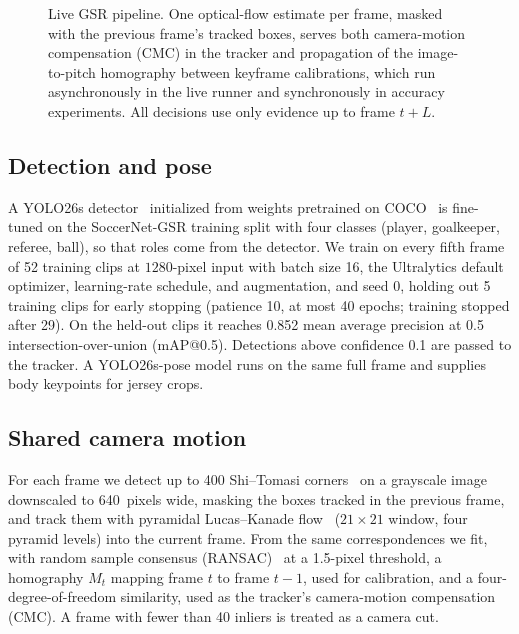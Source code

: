 \documentclass[conference]{IEEEtran}
\begin{document}
\begin{figure}[t]
{}
\caption{Live GSR pipeline. One optical-flow estimate per frame, masked with the previous frame's tracked boxes, serves both camera-motion compensation (CMC) in the tracker and propagation of the image-to-pitch homography between keyframe calibrations, which run asynchronously in the live runner and synchronously in accuracy experiments. All decisions use only evidence up to frame $t+L$.}
\label{fig:pipeline}
\end{figure}

\subsection{Detection and pose}
A YOLO26s detector~\cite{ultralytics} initialized from weights pretrained on COCO~\cite{lin2014coco} is fine-tuned on the SoccerNet-GSR training split with four classes (player, goalkeeper, referee, ball), so that roles come from the detector. We train on every fifth frame of 52 training clips at $1280$-pixel input with batch size 16, the Ultralytics default optimizer, learning-rate schedule, and augmentation, and seed 0, holding out 5 training clips for early stopping (patience 10, at most 40 epochs; training stopped after 29). On the held-out clips it reaches 0.852 mean average precision at 0.5 intersection-over-union (mAP@0.5). Detections above confidence 0.1 are passed to the tracker. A YOLO26s-pose model runs on the same full frame and supplies body keypoints for jersey crops.

\subsection{Shared camera motion}
For each frame we detect up to 400 Shi--Tomasi corners~\cite{shi1994good} on a grayscale image downscaled to 640~pixels wide, masking the boxes tracked in the previous frame, and track them with pyramidal Lucas--Kanade flow~\cite{lucas1981iterative,bouguet2001pyramidal} ($21\times21$ window, four pyramid levels) into the current frame. From the same correspondences we fit, with random sample consensus (RANSAC)~\cite{fischler1981ransac} at a 1.5-pixel threshold, a homography $M_t$ mapping frame $t$ to frame $t-1$, used for calibration, and a four-degree-of-freedom similarity, used as the tracker's camera-motion compensation (CMC). A frame with fewer than 40 inliers is treated as a camera cut.
\end{document}
